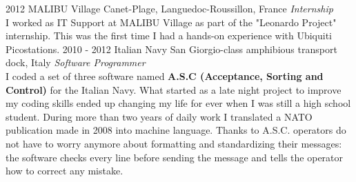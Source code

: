 \documentclass[]{friggeri-cv}
\begin{document}
\begin{entrylist}
\entry
{2012}
{MALIBU Village}
{Canet-Plage, Languedoc-Roussillon, France}
{\emph{Internship} \\
I worked as IT Support at MALIBU Village as part of the "Leonardo Project" internship. This was the first time I had a hands-on experience with Ubiquiti Picostations.}
\entry
{2010 - 2012}
{Italian Navy}
{San Giorgio-class amphibious transport dock, Italy}
{\emph{Software Programmer} \\
I coded a set of three software named \textbf{A.S.C (Acceptance, Sorting and Control)} for the Italian Navy. What started as a late night project to improve my coding skills ended up changing my life for ever when I was still a high school student. During more than two years of daily work I translated a NATO publication made in 2008 into machine language. Thanks to A.S.C. operators do not have to worry anymore about formatting and standardizing their messages: the software checks every line before sending the message and tells the operator how to correct any mistake.}
\end{entrylist}

\newpage

\end{document}
